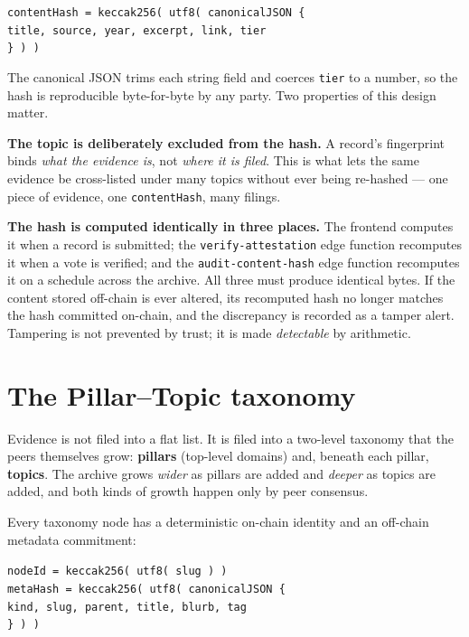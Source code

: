 \documentclass[11pt,a4paper]{article}
\begin{document}
\begin{plainbox}
\texttt{contentHash = keccak256( utf8( canonicalJSON \{}\\
\hspace*{2em}\texttt{title, source, year, excerpt, link, tier}\\
\texttt{\} ) )}
\end{plainbox}

The canonical JSON trims each string field and coerces \texttt{tier} to a
number, so the hash is reproducible byte-for-byte by any party. Two
properties of this design matter.

\textbf{The topic is deliberately excluded from the hash.} A record's
fingerprint binds \emph{what the evidence is}, not \emph{where it is filed}.
This is what lets the same evidence be cross-listed under many topics
without ever being re-hashed --- one piece of evidence, one
\texttt{contentHash}, many filings.

\textbf{The hash is computed identically in three places.} The frontend
computes it when a record is submitted; the \texttt{verify-attestation} edge
function recomputes it when a vote is verified; and the
\texttt{audit-content-hash} edge function recomputes it on a schedule across
the archive. All three must produce identical bytes. If the content stored
off-chain is ever altered, its recomputed hash no longer matches the hash
committed on-chain, and the discrepancy is recorded as a tamper alert.
Tampering is not prevented by trust; it is made \emph{detectable} by
arithmetic.

\section{The Pillar--Topic taxonomy}

Evidence is not filed into a flat list. It is filed into a two-level
taxonomy that the peers themselves grow: \textbf{pillars} (top-level
domains) and, beneath each pillar, \textbf{topics}. The archive grows
\emph{wider} as pillars are added and \emph{deeper} as topics are added, and
both kinds of growth happen only by peer consensus.

Every taxonomy node has a deterministic on-chain identity and an off-chain
metadata commitment:

\begin{plainbox}
\texttt{nodeId   = keccak256( utf8( slug ) )}\\[0.3em]
\texttt{metaHash = keccak256( utf8( canonicalJSON \{}\\
\hspace*{2em}\texttt{kind, slug, parent, title, blurb, tag}\\
\texttt{\} ) )}
\end{plainbox}
\end{document}
